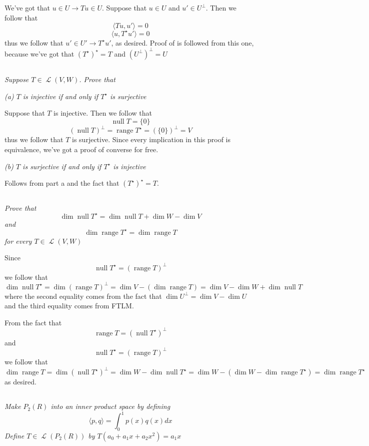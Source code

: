 \documentclass[11pt,oneside,titlepage]{book}
\DeclareMathOperator \map {\mathcal {L}}
\DeclareMathOperator \ns {null}
\DeclareMathOperator \range {range}
\newcommand{\eangle}[1]{\langle #1 \rangle}
\begin{document}
We've got that $u \in U \to Tu \in U$. Suppose that $u \in U$ and  $u' \in U^\perp$.
Then we follow that
$$\eangle{Tu, u'} = 0$$
$$\eangle{u, T^\star u'} = 0$$
thus we follow that $u' \in U' \to T^\star u'$, as desired. Proof of is followed from this
one, because we've got that $(T^\star)^\star = T$ and $(U^\perp)^\perp = U$

\subsection{}

\textit{Suppose $T \in \map(V, W)$. Prove that }

\textit{(a) $T$ is injective if and only if  $T^\star$ is surjective}

Suppose that $T$ is injective. Then we follow that
$$\ns T = \{0\}$$
$$(\ns T)^\perp = \range T^\star = (\{0\})^\perp = V$$
thus we follow that $T$ is surjective. Since every implication in this proof is equivalence,
we've got a proof of converse for free.

\textit{(b) $T$ is surjective if and only if $T^\star$ is injective}

Follows from part a  and the fact that $(T^\star)^\star = T$.

\subsection{}

\textit{Prove that 
$$\dim \ns T^\star = \dim \ns T + \dim W - \dim V$$
and
$$\dim \range T^\star = \dim \range T$$
for every $T \in \map(V, W)$}

Since
$$\ns T^\star = (\range T)^\perp$$
we follow that
$$\dim \ns T^\star = \dim (\range T)^\perp = \dim V - (\dim \range T) = \dim V - \dim  W
+ \dim \ns T$$
where the second equality comes from the fact that $\dim U^\perp = \dim V - \dim U$ and
the third  equality comes from FTLM.

From the fact that
$$ \range T = (\ns T^\star)^\perp$$
and
$$ \ns T^\star = (\range T)^\perp$$
we follow that
$$\dim \range T = \dim (\ns T^\star)^\perp = \dim W - \dim \ns T^\star =
\dim W - (\dim W - \dim \range T^\star) = \dim \range T^\star$$
as desired.

\subsection{}

\textit{Make $P_2(R)$ into an inner product space by defining
$$\eangle{p, q} = \int_0^1{p(x) q(x) dx}$$
Define $T \in \map(P_2(R))$ by $T(a_0 + a_1 x + a_2 x^2) = a_1 x$}
\end{document}
